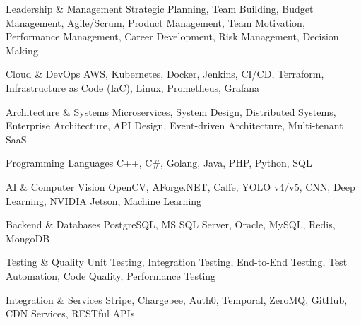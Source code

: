 

\begin{cvskills}

  \cvskill
    {Leadership \& Management} %
    {Strategic Planning, Team Building, Budget Management, Agile/Scrum, Product Management, Team Motivation, Performance Management, Career Development, Risk Management, Decision Making} %

  \cvskill
    {Cloud \& DevOps} %
    {AWS, Kubernetes, Docker, Jenkins, CI/CD, Terraform, Infrastructure as Code (IaC), Linux, Prometheus, Grafana} %

  \cvskill
    {Architecture \& Systems} %
    {Microservices, System Design, Distributed Systems, Enterprise Architecture, API Design, Event-driven Architecture, Multi-tenant SaaS} %

  \cvskill
    {Programming Languages} %
    {C++, C\#, Golang, Java, PHP, Python, SQL} %

  \cvskill
    {AI \& Computer Vision} %
    {OpenCV, AForge.NET, Caffe, YOLO v4/v5, CNN, Deep Learning, NVIDIA Jetson, Machine Learning} %

  \cvskill
    {Backend \& Databases} %
    {PostgreSQL, MS SQL Server, Oracle, MySQL, Redis, MongoDB} %

  \cvskill
    {Testing \& Quality} %
    {Unit Testing, Integration Testing, End-to-End Testing, Test Automation, Code Quality, Performance Testing} %

  \cvskill
    {Integration \& Services} %
    {Stripe, Chargebee, Auth0, Temporal, ZeroMQ, GitHub, CDN Services, RESTful APIs} %

\end{cvskills}
